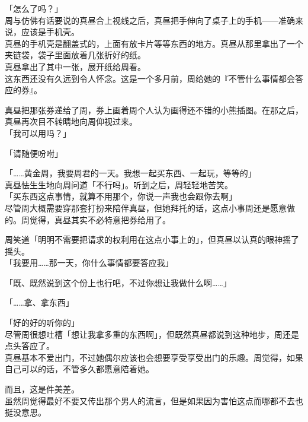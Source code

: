 「怎么了吗？」\\

周与仿佛有话要说的真昼合上视线之后，真昼把手伸向了桌子上的手机——准确来说，应该是手机壳。\\

真昼的手机壳是翻盖式的，上面有放卡片等等东西的地方。真昼从那里拿出了一个夹链袋，袋子里面放着几张折好的纸。\\

真昼拿出了其中一张，展开纸给周看。\\

这东西还没有久远到令人怀念。这是一个多月前，周给她的『不管什么事情都会答应的券』。

真昼把那张券递给了周，券上画着周个人认为画得还不错的小熊插图。在那之后，真昼再次目不转睛地向周仰视过来。\\

「我可以用吗？」

「请随便吩咐」

「……黄金周，我要周君的一天。我想一起买东西、一起玩，等等的」\\

真昼怯生生地向周问道「不行吗」。听到之后，周轻轻地苦笑。\\

「买东西这点事情，就算不用那个，你说一声我也会跟你去啊」\\

尽管周大概需要穿那套打扮来陪伴真昼，但她拜托的话，这点小事周还是愿意做的。周觉得，真昼其实不必特意把券给用了。

周笑道「明明不需要把请求的权利用在这点小事上的」，但真昼以认真的眼神摇了摇头。\\

「我要用……那一天，你什么事情都要答应我」

「既、既然说到这个份上也行吧，不过你想让我做什么啊……」

「……拿、拿东西」

「好的好的听你的」\\

尽管周很想吐槽「想让我拿多重的东西啊」，但既然真昼都说到这种地步，周还是点头答应了。\\

真昼基本不爱出门，不过她偶尔应该也会想要享受享受出门的乐趣。周觉得，如果自己可以的话，不管多久都愿意陪着她。

而且，这是件美差。\\

虽然周觉得最好不要又传出那个男人的流言，但是如果因为害怕这点而哪都不去也挺没意思。\\

